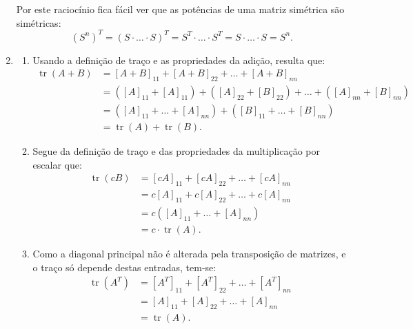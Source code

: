 \documentclass[12pt,a4paper]{article}
\newcommand*\tr{\operatorname{tr}}
\begin{document}
\begin{enumerate}
Por este raciocínio fica fácil ver que as potências de uma matriz simétrica são simétricas:
\[
(S^n)^T
= (S \cdot \ldots \cdot S)^T
= S^T \cdot \ldots \cdot S^T
= S \cdot \ldots \cdot S = S^n.
\]

\item
\begin{enumerate}
\item Usando a definição de traço e as propriedades da adição, resulta que:
\begin{align*}
\tr(A+B)
& = [A+B]_{11} + [A+B]_{22} + \ldots + [A+B]_{nn} \\
& = ([A]_{11} + [A]_{11}) + ([A]_{22} + [B]_{22}) + \ldots + ([A]_{nn} + [B]_{nn}) \\
& = ([A]_{11} + \dots + [A]_{nn}) + ([B]_{11} + \ldots + [B]_{nn})\\
& = \tr(A)+\tr(B).
\end{align*}
\item Segue da definição de traço e das propriedades da multiplicação por escalar que:
\begin{align*}
\tr(cB)
& = [cA]_{11} + [cA]_{22} + \ldots + [cA]_{nn} \\
& = c[A]_{11} + c[A]_{22} + \ldots + c[A]_{nn} \\
& = c([A]_{11} + \dots + [A]_{nn}) \\
& = c \cdot \tr(A).
\end{align*}
\item Como a diagonal principal não é alterada pela transposição de matrizes, e o traço só depende destas entradas, tem-se:
\begin{align*}
\tr(A^T)
& = [A^T]_{11} + [A^T]_{22} + \ldots + [A^T]_{nn} \\
& = [A]_{11} + [A]_{22} + \ldots + [A]_{nn} \\
& = \tr(A).
\end{align*}
\end{enumerate}
\end{enumerate}
\end{document}
